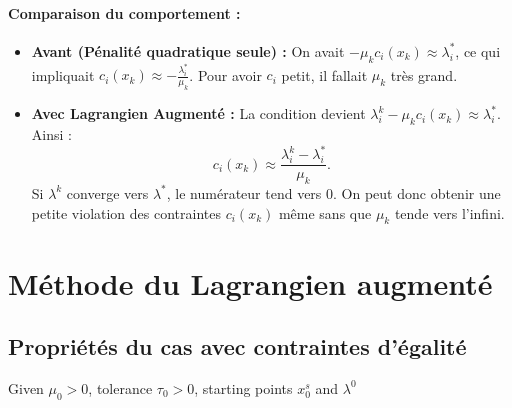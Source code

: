 \paragraph{Comparaison du comportement :}
\begin{itemize}
    \item \textbf{Avant (Pénalité quadratique seule) :} On avait $-\mu_k c_i(x_k) \approx \lambda_i^*$, ce qui impliquait $c_i(x_k) \approx -\frac{\lambda_i^*}{\mu_k}$. Pour avoir $c_i$ petit, il fallait $\mu_k$ très grand.
    \item \textbf{Avec Lagrangien Augmenté :} La condition devient $\lambda_i^k - \mu_k c_i(x_k) \approx \lambda_i^*$.
    Ainsi :
    \[
        c_i(x_k) \approx \frac{\lambda_i^k - \lambda_i^*}{\mu_k}.
    \]
    Si $\lambda^k$ converge vers $\lambda^*$, le numérateur tend vers 0. On peut donc obtenir une petite violation des contraintes $c_i(x_k)$ même sans que $\mu_k$ tende vers l'infini.
\end{itemize}



\section{Méthode du Lagrangien augmenté}

\subsection{Propriétés du cas avec contraintes d'égalité}

\begin{algorithm}[H]
    \caption{Augmented Lagrangian method for equality constraints}
    \SetAlgoLined
    Given $\mu_0>0$, tolerance $\tau_0>0$, starting points $x_0^s$ and $\lambda^0$\;
\end{algorithm}

